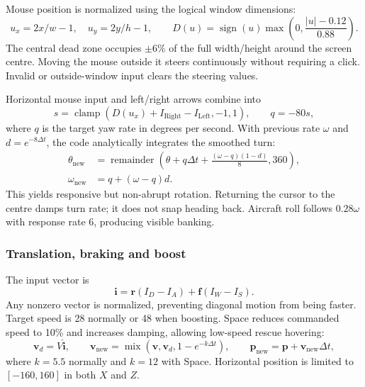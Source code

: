 Mouse position is normalized using the logical window dimensions:
\begin{equation}
u_x=2x/w-1,\quad u_y=2y/h-1,\qquad
D(u)=\operatorname{sign}(u)\max\left(0,\frac{|u|-0.12}{0.88}\right).
\end{equation}
The central dead zone occupies $\pm6\%$ of the full width/height around the screen centre. Moving the mouse outside it steers continuously without requiring a click. Invalid or outside-window input clears the steering values.

Horizontal mouse input and left/right arrows combine into
\begin{equation}
s=\operatorname{clamp}(D(u_x)+I_{\mathrm{Right}}-I_{\mathrm{Left}},-1,1),\qquad q=-80s,
\end{equation}
where $q$ is the target yaw rate in degrees per second. With previous rate $\omega$ and $d=e^{-8\Delta t}$, the code analytically integrates the smoothed turn:
\begin{align}
\theta_{\mathrm{new}}&=\operatorname{remainder}\left(\theta+q\Delta t+\frac{(\omega-q)(1-d)}{8},360\right),\\
\omega_{\mathrm{new}}&=q+(\omega-q)d.
\end{align}
This yields responsive but non-abrupt rotation. Returning the cursor to the centre damps turn rate; it does not snap heading back. Aircraft roll follows $0.28\omega$ with response rate 6, producing visible banking.

\subsubsection{Translation, braking and boost}
The input vector is
\begin{equation}
\mathbf i=\mathbf r(I_D-I_A)+\mathbf f(I_W-I_S).
\end{equation}
Any nonzero vector is normalized, preventing diagonal motion from being faster. Target speed is 28 normally or 48 when boosting. Space reduces commanded speed to 10\% and increases damping, allowing low-speed rescue hovering:
\begin{equation}
\mathbf v_d=V\widehat{\mathbf i},\qquad
\mathbf v_{\mathrm{new}}=\operatorname{mix}(\mathbf v,\mathbf v_d,1-e^{-k\Delta t}),\qquad
\mathbf p_{\mathrm{new}}=\mathbf p+\mathbf v_{\mathrm{new}}\Delta t,
\end{equation}
where $k=5.5$ normally and $k=12$ with Space. Horizontal position is limited to $[-160,160]$ in both $X$ and $Z$.

